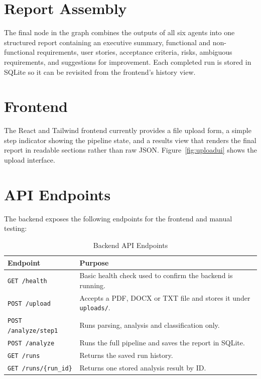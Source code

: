 \documentclass[12pt,a4paper,openany]{report}
\begin{document}
\section{Report Assembly}
The final node in the graph combines the outputs of all six agents into
one structured report containing an executive summary, functional and
non-functional requirements, user stories, acceptance criteria, risks,
ambiguous requirements, and suggestions for improvement. Each completed
run is stored in SQLite so it can be revisited from the frontend's history
view.

\section{Frontend}
The React and Tailwind frontend currently provides a file upload form, a
simple step indicator showing the pipeline state, and a results view that
renders the final report in readable sections rather than raw JSON.
Figure~\ref{fig:uploadui} shows the upload interface.

\section{API Endpoints}
The backend exposes the following endpoints for the frontend and manual
testing:

\begin{table}[H]
\centering
\caption{Backend API Endpoints}
\label{tab:api}
\begin{tabularx}{\textwidth}{|p{3.2cm}|X|}
\hline
\textbf{Endpoint} & \textbf{Purpose} \\
\hline
\texttt{GET /health} & Basic health check used to confirm the backend is running. \\
\hline
\texttt{POST /upload} & Accepts a PDF, DOCX or TXT file and stores it under \texttt{uploads/}. \\
\hline
\texttt{POST /analyze/step1} & Runs parsing, analysis and classification only. \\
\hline
\texttt{POST /analyze} & Runs the full pipeline and saves the report in SQLite. \\
\hline
\texttt{GET /runs} & Returns the saved run history. \\
\hline
\texttt{GET /runs/\{run\_id\}} & Returns one stored analysis result by ID. \\
\hline
\end{tabularx}
\end{table}
\FloatBarrier
\end{document}
